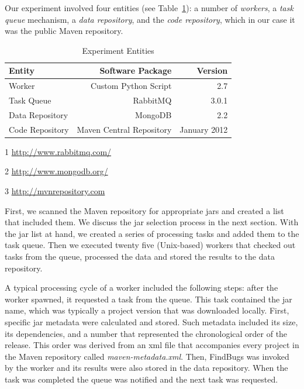 \documentclass[conference]{llncs}
\begin{document}
Our experiment involved four entities (see Table~\ref{tbl:exp}):
a number of {\it workers}, a {\it task queue}
mechanism, a {\it data repository}, and the {\it code repository},
which in our case it was the public Maven repository.

\begin{table}
\centering
\begin{threeparttable}
\caption{Experiment Entities}
\label{tbl:exp}
\begin{tabular}{l r r}
\hline
Entity & Software Package & Version\\
\hline
Worker & Custom Python Script & 2.7\\
Task Queue & RabbitMQ\tnote{1} & 3.0.1 \\
Data Repository & MongoDB\tnote{2} & 2.2 \\
Code Repository & Maven Central Repository\tnote{3} & January 2012 \\
\hline
\end{tabular}
 \begin{tablenotes}
       	\item[1] \url{http://www.rabbitmq.com/}
       	\item[2] \url{http://www.mongodb.org/}
	\item[3] \url{http://mvnrepository.com}
   \end{tablenotes}
\end{threeparttable}
\end{table}

First, we scanned the Maven repository for appropriate {\sc jar}s and created a
list that included them. We discuss the {\sc jar} selection process in the next 
section. With the {\sc jar} list at hand, we created a series of processing tasks
and added them to the task queue. Then we executed twenty five (Unix-based)
workers that checked out tasks from the queue, processed the data and stored the
results to the data repository.

A typical processing cycle of a worker included the following steps: after
the worker spawned, it requested a task from the queue. This task contained
the {\sc jar} name, which was typically a project version that was downloaded locally.
First, specific {\sc jar} metadata were calculated and stored. Such metadata included
its size, its dependencies, and a number that represented the chronological order of the
release. This order was derived from an {\sc xml} file that
accompanies every project in the Maven repository called {\it
maven-metadata.xml}. Then, FindBugs was invoked by the worker and its results were
also stored in the data repository. When the task was completed the queue
was notified and the next task was requested.
\end{document}
